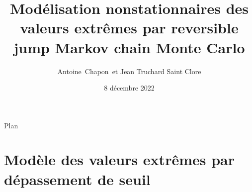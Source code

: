 \documentclass[aspectratio=169]{beamer}
\date{8 décembre 2022}
\title{Modélisation nonstationnaires des valeurs extrêmes par reversible jump Markov chain Monte Carlo}
\author{Antoine~Chapon~et Jean Truchard Saint Clore}
\institute[Universities of Somewhere and Elsewhere] %
{
  cours ETE 405
 }
\begin{document}
\begin{frame}
  \titlepage
\end{frame}



\section*{}


\begin{frame}{Plan}
\tableofcontents
\end{frame}


\section{Modèle des valeurs extrêmes par dépassement de seuil}
\end{document}
